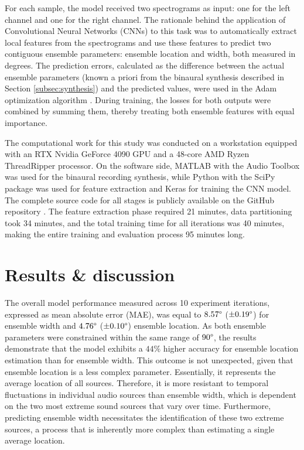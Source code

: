 \documentclass{article}
\begin{document}
For each sample, the model received two spectrograms as input: one for the left channel and one for the right channel. The rationale behind the application of Convolutional Neural Networks (CNNs) to this task was to automatically extract local features from the spectrograms and use these features to predict two contiguous ensemble parameters: ensemble location and width, both measured in degrees. The prediction errors, calculated as the difference between the actual ensemble parameters (known a priori from the binaural synthesis described in Section \ref{subsec:synthesis}) and the predicted values, were used in the Adam optimization algorithm \parencite{kingma_adam_2014}. During training, the losses for both outputs were combined by summing them, thereby treating both ensemble features with equal importance.

The computational work for this study was conducted on a workstation equipped with an RTX Nvidia GeForce 4090 GPU and a 48-core AMD Ryzen ThreadRipper processor. On the software side, MATLAB \parencite{MATLAB} with the Audio Toolbox \parencite{MATLAB_Audio_Toolbox} was used for the binaural recording synthesis, while Python \parencite{python} with the SciPy package \parencite{2020SciPy-NMeth} was used for feature extraction and Keras \parencite{chollet2015keras} for training the CNN model. The complete source code for all stages is publicly available on the GitHub repository \parencite{github_repo}. The feature extraction phase required 21 minutes, data partitioning took 34 minutes, and the total training time for all iterations was 40 minutes, making the entire training and evaluation process 95 minutes long.

\section{Results \& discussion}
\label{sec:results}


The overall model performance measured across 10 experiment iterations, expressed as mean absolute error (MAE), was equal to $8.57\degree$ ($\pm0.19\degree$) for ensemble width and $4.76\degree$ ($\pm0.10\degree$) ensemble location. As both ensemble parameters were constrained within the same range of $90\degree$, the results demonstrate that the model exhibits a $44\%$ higher accuracy for ensemble location estimation than for ensemble width. This outcome is not unexpected, given that ensemble location is a less complex parameter. Essentially, it represents the average location of all sources. Therefore, it is more resistant to temporal fluctuations in individual audio sources than ensemble width, which is dependent on the two most extreme sound sources that vary over time. Furthermore, predicting ensemble width necessitates the identification of these two extreme sources, a process that is inherently more complex than estimating a single average location.
\end{document}
